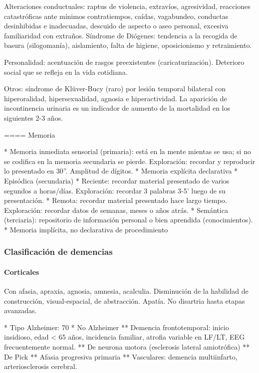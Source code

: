 \documentclass[encares.tex]{subfiles}
\begin{document}
Alteraciones conductuales: raptus de violencia, extravíos, agresividad, reacciones catastróficas ante mínimos contratiempos, caídas, vagabundeo, conductas desinhibidas e inadecuadas, descuido de aspecto o aseo personal, excesiva familiaridad con extraños. Síndrome de Diógenes: tendencia a la recogida de basura (silogomanía), aislamiento, falta de higiene, oposicionismo y retraimiento.

Personalidad: acentuación de rasgos preexistentes (caricaturización). Deterioro social que se refleja en la vida cotidiana.

Otros: síndrome de Klüver-Bucy (raro) por lesión temporal bilateral con hiperoralidad, hipersexualidad, agnosia e hiperactividad. La aparición de incontinencia urinaria es un indicador de aumento de la mortalidad en los siguientes 2-3 años.

==== Memoria

* Memoria inmediata sensorial (primaria): está en la mente mientas se usa; si no se codifica en la memoria secundaria se pierde. Exploración: recordar y reproducir lo presentado en 30”. Amplitud de dígitos.
* Memoria explícita declarativa
* Episódica (secundaria)
* Reciente: recordar material presentado de varios segundos a horas/días. Exploración: recordar 3 palabras 3-5’ luego de su presentación.
* Remota: recordar material presentado hace largo tiempo. Exploración: recordar datos de semanas, meses o años atrás.
* Semántica (terciaria): repositorio de información personal o bien aprendida (conocimientos).
* Memoria implícita, no declarativa de procedimiento

\subsubsection*{Clasificación de demencias}
\paragraph{Corticales}
Con afasia, apraxia, agnosia, amnesia, acalculia. Disminución de la habilidad de construcción, visual-espacial, de abstracción. Apatía. No disartria hasta etapas avanzadas.

* Tipo Alzheimer: 70%
* No Alzheimer
** Demencia frontotemporal: inicio insidioso, edad < 65 años, incidencia familiar, atrofia variable en LF/LT, EEG frecuentemente normal.
** De neurona motora (esclerosis lateral amiotrófica)
** De Pick
** Afasia progresiva primaria
** Vasculares: demencia multiinfarto, arteriosclerosis cerebral.
\end{document}
